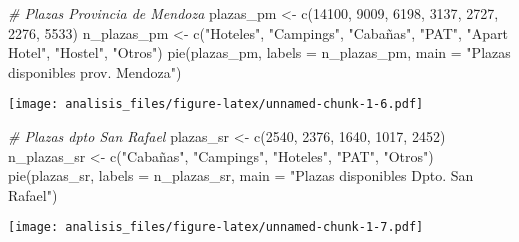 \documentclass[
]{article}
\newenvironment{Shaded}{\begin{snugshade}}{\end{snugshade}}
\newcommand{\AttributeTok}[1]{\textcolor[rgb]{0.77,0.63,0.00}{#1}}
\newcommand{\CommentTok}[1]{\textcolor[rgb]{0.56,0.35,0.01}{\textit{#1}}}
\newcommand{\DecValTok}[1]{\textcolor[rgb]{0.00,0.00,0.81}{#1}}
\newcommand{\FunctionTok}[1]{\textcolor[rgb]{0.00,0.00,0.00}{#1}}
\newcommand{\NormalTok}[1]{#1}
\newcommand{\OtherTok}[1]{\textcolor[rgb]{0.56,0.35,0.01}{#1}}
\newcommand{\StringTok}[1]{\textcolor[rgb]{0.31,0.60,0.02}{#1}}
\begin{document}
\begin{Shaded}
\begin{Highlighting}[]
\CommentTok{\# Plazas Provincia de Mendoza}
\NormalTok{plazas\_pm }\OtherTok{\textless{}{-}} \FunctionTok{c}\NormalTok{(}\DecValTok{14100}\NormalTok{, }\DecValTok{9009}\NormalTok{, }\DecValTok{6198}\NormalTok{, }\DecValTok{3137}\NormalTok{, }\DecValTok{2727}\NormalTok{, }\DecValTok{2276}\NormalTok{, }\DecValTok{5533}\NormalTok{)}
\NormalTok{n\_plazas\_pm }\OtherTok{\textless{}{-}} \FunctionTok{c}\NormalTok{(}\StringTok{"Hoteles"}\NormalTok{, }\StringTok{"Campings"}\NormalTok{, }\StringTok{"Cabañas"}\NormalTok{, }\StringTok{"PAT"}\NormalTok{, }\StringTok{"Apart Hotel"}\NormalTok{, }\StringTok{"Hostel"}\NormalTok{, }\StringTok{"Otros"}\NormalTok{)}
\FunctionTok{pie}\NormalTok{(plazas\_pm, }\AttributeTok{labels =}\NormalTok{ n\_plazas\_pm, }\AttributeTok{main =} \StringTok{"Plazas disponibles prov. Mendoza"}\NormalTok{)}
\end{Highlighting}
\end{Shaded}

\texttt{[image: analisis\_files/figure-latex/unnamed-chunk-1-6.pdf]}

\begin{Shaded}
\begin{Highlighting}[]
\CommentTok{\# Plazas dpto San Rafael}
\NormalTok{plazas\_sr }\OtherTok{\textless{}{-}} \FunctionTok{c}\NormalTok{(}\DecValTok{2540}\NormalTok{, }\DecValTok{2376}\NormalTok{, }\DecValTok{1640}\NormalTok{, }\DecValTok{1017}\NormalTok{, }\DecValTok{2452}\NormalTok{)}
\NormalTok{n\_plazas\_sr }\OtherTok{\textless{}{-}} \FunctionTok{c}\NormalTok{(}\StringTok{"Cabañas"}\NormalTok{, }\StringTok{"Campings"}\NormalTok{, }\StringTok{"Hoteles"}\NormalTok{, }\StringTok{"PAT"}\NormalTok{, }\StringTok{"Otros"}\NormalTok{)}
\FunctionTok{pie}\NormalTok{(plazas\_sr, }\AttributeTok{labels =}\NormalTok{ n\_plazas\_sr, }\AttributeTok{main =} \StringTok{"Plazas disponibles Dpto. San Rafael"}\NormalTok{) }
\end{Highlighting}
\end{Shaded}

\texttt{[image: analisis\_files/figure-latex/unnamed-chunk-1-7.pdf]}
\end{document}
